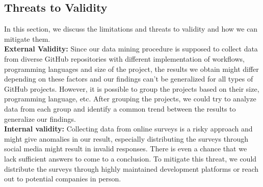 \documentclass[conference]{IEEEtran}
\begin{document}
\subsection{Threats to Validity}
In this section, we discuss the limitations and threats to
validity and how we can mitigate them.\\

\textbf{External Validity:} Since our data mining procedure is supposed to collect data from diverse GitHub repositories with different implementation of workflows, programming languages and size of the project, the results we obtain might differ depending on these factors and our findings can’t be generalized for all types of GitHub projects. However, it is possible to group the projects based on their size, programming language, etc. After grouping the projects, we could try to analyze data from each group and identify a common trend between the results to generalize our findings.\\

\textbf{Internal validity:} Collecting data from online surveys is a risky approach and might give anomalies in our result, especially distributing the surveys through social media might result in invalid responses. There is even a chance that we lack sufficient answers to come to a conclusion. To mitigate this threat, we could distribute the surveys through highly maintained development platforms or reach out to potential companies in person. 



\vspace{12pt}
\end{document}
